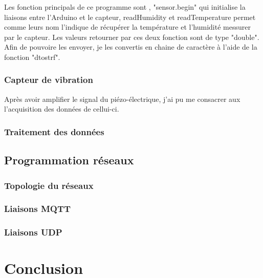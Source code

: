 \documentclass[11pt,french,a4paper]{article}
\begin{document}
Les fonction principals de ce programme sont , "sensor.begin" qui initialise la liaisons entre l'Arduino et le capteur, readHumidity et readTemperature permet comme leurs nom l'indique de récupérer la température et l'humidité messurer par le capteur. Les valeurs retourner par ces deux fonction sont de type "double". Afin de pouvoire les envoyer, je les convertis en chaine de caractère à l'aide de la fonction "dtostrf".

\subsubsection{Capteur de vibration}
Après avoir amplifier le signal du piézo-électrique, j'ai pu me consacrer aux l'acquisition des données de cellui-ci.

\subsubsection{Traitement des données}
\subsection{Programmation réseaux}
\subsubsection{Topologie du réseaux}
\subsubsection{Liaisons MQTT}
\subsubsection{Liaisons UDP}
\section{Conclusion}

\newpage
\listoffigures
\end{document}
